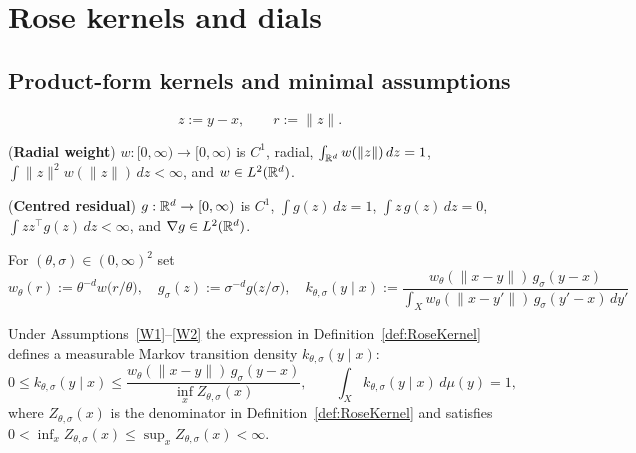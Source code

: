 \section{Rose kernels and dials}

 
 	\subsection{Product-form kernels and minimal assumptions}
	
		\[
   			z := y-x,  \qquad r := \|z\|.
		\]

		\begin{assumptionlist}[label=(W\arabic*)]
			\item \label{W1}(\textbf{Radial weight}) $w:[0,\infty)\to[0,\infty)$ is $C^{1}$, radial, $\int_{\mathbb{R}^{d}} w(\|z\|)\,dz = 1$,  $\int\|z\|^{2} w(\|z\|)\,dz < \infty$, and $w\in L^{2}(\mathbb{R}^{d})$.

			\item \label{W2} (\textbf{Centred residual}) $g:\mathbb{R}^{d}\to[0,\infty)$ is $C^{1}$,  $\int g(z)\,dz = 1$,  $\int z\,g(z)\,dz = 0$, $\int zz^{\top} g(z)\,dz < \infty$,  and $\nabla g\in L^{2}(\mathbb{R}^{d})$.
			
		\end{assumptionlist}
	
		\begin{definition}\label{def:RoseKernel}
			For $(\theta,\sigma)\in(0,\infty)^{2}$ set
			\[
				w_\theta(r):=\theta^{-d}w\!\bigl(r/\theta\bigr),  \quad g_\sigma(z):=\sigma^{-d}g\!\bigl(z/\sigma\bigr), \quad k_{\theta,\sigma}(y\mid x):=  \frac{w_\theta(\|x-y\|)\,g_\sigma(y-x)} {\displaystyle\int_X w_\theta(\|x-y'\|)\,g_\sigma(y'-x)\,dy'} 
			\]
		\end{definition}
		
		\begin{lemma}\label{lem:k-norm-bounds}
			Under Assumptions~\ref{W1}--\ref{W2}
			the expression in Definition~\ref{def:RoseKernel} defines a
			measurable Markov transition density $k_{\theta,\sigma}(y\mid x)$:
			\[
  				0 \le k_{\theta,\sigma}(y\mid x) \le
  				\frac{w_\theta(\|x-y\|)\,g_\sigma(y-x)}{\inf_{x}\!Z_{\theta,\sigma}(x)},
  				\qquad
  				\int_X k_{\theta,\sigma}(y\mid x)\,d\mu(y)=1,
			\]
			where $Z_{\theta,\sigma}(x)$ is the denominator in
			Definition~\ref{def:RoseKernel} and satisfies
			$0<\inf_x Z_{\theta,\sigma}(x)\le \sup_x Z_{\theta,\sigma}(x) < \infty$.
		\end{lemma}

